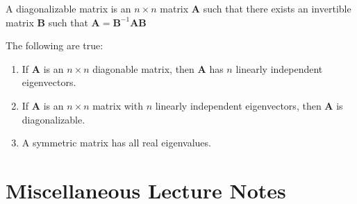 \documentclass[crop=false,class=book,oneside]{standalone}                      %
\begin{document}
        \begin{definition}
            A diagonalizable matrix is an
            ${n}\times{n}$ matrix
            $\mathbf{A}$ such that there exists
            an invertible matrix $\mathbf{B}$
            such that
            $\mathbf{A}=\mathbf{B}^{-1}\mathbf{A}\mathbf{B}$
        \end{definition}
        \begin{theorem*}
            The following are true:
            \begin{enumerate}
                \item If $\mathbf{A}$ is an ${n}\times{n}$
                    diagonable matrix, then $\mathbf{A}$
                    has $n$ linearly independent
                    eigenvectors.
                \item If $\mathbf{A}$ is an ${n}\times{n}$
                    matrix with $n$ linearly independent
                    eigenvectors, then $\mathbf{A}$
                    is diagonalizable.
                \item A symmetric matrix has all real
                    eigenvalues.
            \end{enumerate}
        \end{theorem*}
    \section{Miscellaneous Lecture Notes}
\end{document}
